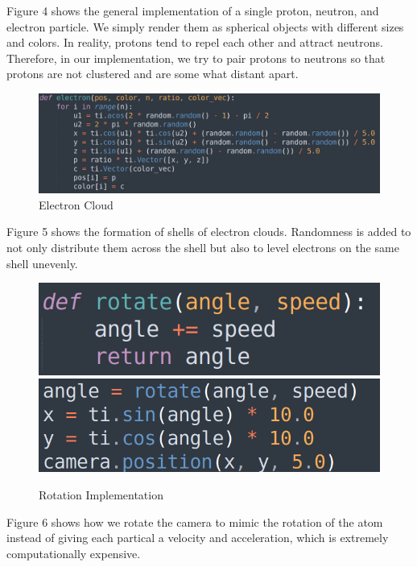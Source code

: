 \documentclass[acmtog]{acmart}
\begin{document}
Figure 4 shows the general implementation of a single proton, neutron, and electron particle. We simply render them as spherical objects with different sizes and colors. In reality, protons tend to repel each other and attract neutrons. Therefore, in our implementation, we try to pair protons to neutrons so that protons are not clustered and are some what distant apart.

\begin{figure}[h]
  \centering
  \includegraphics[width=\linewidth]{./electron_cloud.png}
  \caption{Electron Cloud}
\end{figure}

Figure 5 shows the formation of shells of electron clouds. Randomness is added to not only distribute them across the shell but also to level electrons on the same shell unevenly.

\begin{figure}[h]
  \centering
  \includegraphics[width=\linewidth]{./rotate.png}
  \includegraphics[width=\linewidth]{./camera.png}
  \caption{Rotation Implementation}
\end{figure}

Figure 6 shows how we rotate the camera to mimic the rotation of the atom instead of giving each partical a velocity and acceleration, which is extremely computationally expensive.
\end{document}
